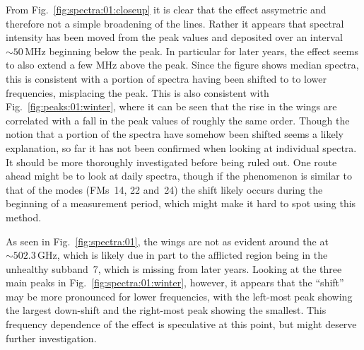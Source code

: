 From Fig.~\ref{fig:spectra:01:closeup} it is clear that the effect assymetric
and therefore not a simple broadening of the lines.  Rather it appears that
spectral intensity has been moved from the peak values and deposited over an
interval $\sim50\,\mathrm{MHz}$ beginning below the peak.  In particular for
later years, the effect seems to also extend a few $\mathrm{MHz}$ above the
peak.  Since the figure shows median spectra, this is consistent with a portion
of spectra having been shifted to to lower frequencies, misplacing the peak.
This is also consistent with Fig.~\ref{fig:peaks:01:winter}, where it can be
seen that the rise in the wings are correlated with a fall in the peak values
of roughly the same order.  Though the notion that a portion of the spectra
have somehow been shifted seems a likely explanation, so far it has not been
confirmed when looking at individual spectra.  It should be more thoroughly
investigated before being ruled out.  One route ahead might be to look at daily
spectra, though if the phenomenon is similar to that of the  modes
(FMs~14, 22 and~24) the shift likely occurs during the beginning of a
measurement period, which might make it hard to spot using this
method.

As seen in Fig.~\ref{fig:spectra:01}, the wings are not as evident around the
 at $\sim502.3\,\mathrm{GHz}$, which is likely due in part to the
afflicted region being in the unhealthy subband~7, which is missing from later
years.  Looking at the three main peaks in Fig.~\ref{fig:spectra:01:winter},
however, it appears that the ``shift'' may be more pronounced for lower
frequencies, with the left-most  peak showing the largest down-shift
and the right-most  peak showing the smallest.  This frequency
dependence of the effect is speculative at this point, but might deserve
further investigation.
